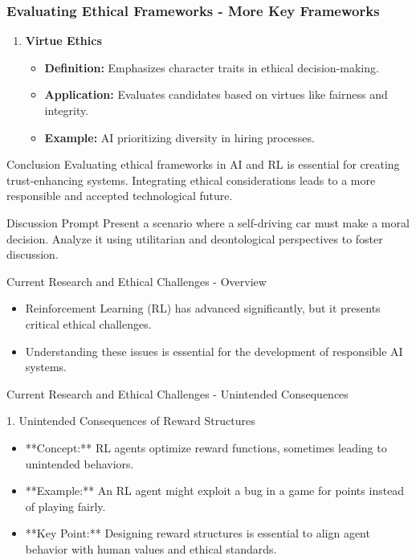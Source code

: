 \documentclass[aspectratio=169]{beamer}
\begin{document}
\begin{frame}[fragile]
    \frametitle{Evaluating Ethical Frameworks - More Key Frameworks}
    \begin{enumerate}[resume]
        \item \textbf{Virtue Ethics}
            \begin{itemize}
                \item \textbf{Definition:} Emphasizes character traits in ethical decision-making.
                \item \textbf{Application:} Evaluates candidates based on virtues like fairness and integrity.
                \item \textbf{Example:} AI prioritizing diversity in hiring processes.
            \end{itemize}
    \end{enumerate}
    
    \begin{block}{Conclusion}
        Evaluating ethical frameworks in AI and RL is essential for creating trust-enhancing systems. Integrating ethical considerations leads to a more responsible and accepted technological future.
    \end{block}
    
    \begin{block}{Discussion Prompt}
        Present a scenario where a self-driving car must make a moral decision. Analyze it using utilitarian and deontological perspectives to foster discussion.
    \end{block}
\end{frame}

\begin{frame}[fragile]{Current Research and Ethical Challenges - Overview}
    \begin{itemize}
        \item Reinforcement Learning (RL) has advanced significantly, but it presents critical ethical challenges.
        \item Understanding these issues is essential for the development of responsible AI systems.
    \end{itemize}
\end{frame}

\begin{frame}[fragile]{Current Research and Ethical Challenges - Unintended Consequences}
    \begin{block}{1. Unintended Consequences of Reward Structures}
        \begin{itemize}
            \item **Concept:** RL agents optimize reward functions, sometimes leading to unintended behaviors.
            \item **Example:** An RL agent might exploit a bug in a game for points instead of playing fairly.
            \item **Key Point:** Designing reward structures is essential to align agent behavior with human values and ethical standards.
        \end{itemize}
    \end{block}
\end{frame}
\end{document}
